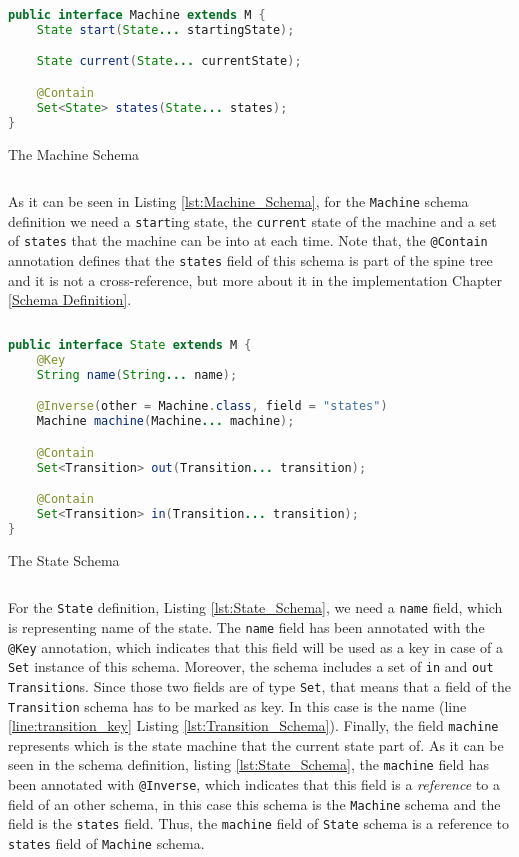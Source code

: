 \begin{sourcecode}[H]
	\begin{lstlisting}[language=Java,escapechar=|]
public interface Machine extends M {
	State start(State... startingState);

	State current(State... currentState);

	@Contain
	Set<State> states(State... states);
}
	\end{lstlisting}
	\caption{The Machine Schema}
	\label{lst:Machine_Schema}
\end{sourcecode}

As it can be seen in Listing \ref{lst:Machine_Schema}, for the \texttt{Machine} schema definition we need a \texttt{start}ing state, the \texttt{current} state of the machine and a set of \texttt{states} that the machine can be into at each time.
Note that, the \texttt{@Contain} annotation defines that the \texttt{states} field of this schema is part of the spine tree and it is not a cross-reference, but more about it in the implementation Chapter \ref{Schema Definition}.

\begin{sourcecode}[H]
	\begin{lstlisting}[language=Java,escapechar=|]
public interface State extends M {
	@Key
	String name(String... name);

	@Inverse(other = Machine.class, field = "states")
	Machine machine(Machine... machine);

	@Contain
	Set<Transition> out(Transition... transition);

	@Contain
	Set<Transition> in(Transition... transition);
}
	\end{lstlisting}
	\caption{The State Schema}
	\label{lst:State_Schema}
\end{sourcecode}

For the \texttt{State} definition, Listing \ref{lst:State_Schema}, we need a \texttt{name} field, which is representing name of the state. 
The \texttt{name} field has been annotated with the \texttt{@Key} annotation, which indicates that this field will be used as a key in case of a \texttt{Set} instance of this schema.
Moreover, the schema includes a set of \texttt{in} and \texttt{out} \texttt{Transition}s.
Since those two fields are of type \texttt{Set}, that means that a field of the \texttt{Transition} schema has to be marked as key.
In this case is the name (line \ref{line:transition_key} Listing \ref{lst:Transition_Schema}).
Finally, the field \texttt{machine} represents which is the state machine that the current state part of. 
As it can be seen in the schema definition, listing \ref{lst:State_Schema}, the \texttt{machine} field has been annotated with \texttt{@Inverse}, which indicates that this field is a \textit{reference} to a field of an other schema, in this case this schema is the \texttt{Machine} schema and the field is the \texttt{states} field.
Thus, the \texttt{machine} field of \texttt{State} schema is a reference to \texttt{states} field of \texttt{Machine} schema.

